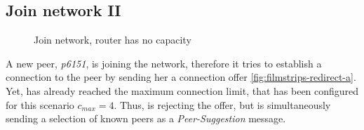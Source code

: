 \subsection{Join network II}

\begin{figure}[htb!]
  \centering
	\caption{Join network, router has no capacity}
\label{fig:filmstrips-redirect}
\end{figure}

A new peer, \textit{p6151}, is joining the network, therefore it tries to establish a connection to the \router peer \alice by sending her a connection offer \vref{fig:filmstrips-redirect-a}. 
Yet, \alice has already reached the maximum connection limit, that has been configured for this scenario $c_{max}=4$. Thus, \alice is rejecting the offer, but is simultaneously sending a selection of known peers as a \textit{Peer-Suggestion} message.

